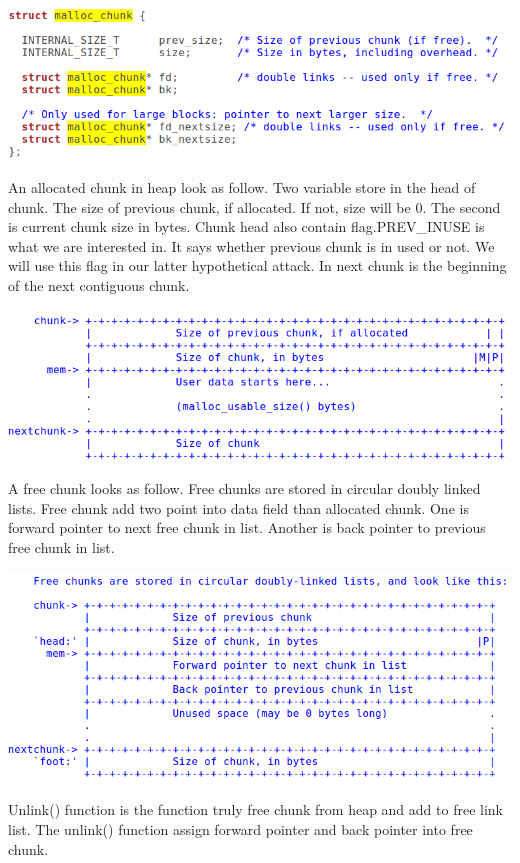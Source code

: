 \documentclass[12pt]{article}
\begin{document}
\includegraphics[scale=0.4]{malloc_chunk_code.png}

An allocated chunk in heap look as follow. Two variable store in the head of chunk. The size of previous chunk, if allocated. If not, size will be 0. The second is current chunk size in bytes. Chunk head also contain flag.PREV\_INUSE is what we are interested in. It says whether previous chunk is in used or not. We will use this flag in our latter hypothetical attack. In next chunk is the beginning of the next contiguous chunk.  
 
\includegraphics[scale=0.5]{allocated_chunk.png}

A free chunk looks as follow. Free chunks are stored in circular doubly linked lists. Free chunk add two point into data field than allocated chunk. One is forward pointer to next free chunk in list. Another is back pointer to previous free chunk in list. 

\includegraphics[scale=0.5]{free_chunk.png}

Unlink() function is the function truly free chunk from heap and add to free link list. The unlink() function assign forward pointer and back pointer into free chunk.
\end{document}
